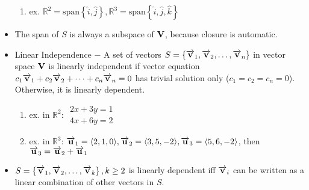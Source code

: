 \documentclass[12pt]{article}
\begin{document}
\begin{itemize}
    \begin{enumerate}

      \item ex. $\mathbb{R}^2=\text{span}\left\{ \hat{i},\hat{j} \right\}, \mathbb{R}^3=\text{span}\left\{ \hat{i},\hat{j},\hat{k} \right\}$

    \end{enumerate}

  \item The span of $S$ is always a subspace of $\bold{V}$, because closure is automatic.

  \item Linear Independence $-$ A set of vectors $S=\left\{ \overrightarrow{\bold{v}}_1,\overrightarrow{\bold{v}}_2,\dots,\overrightarrow{\bold{v}}_n \right\}$ in vector space $\bold{V}$ is linearly independent if vector equation $c_1\overrightarrow{\bold{v}}_1+c_2\overrightarrow{\bold{v}}_2+\dots+c_n\overrightarrow{\bold{v}}_n=0$ has trivial solution only ($c_1=c_2=c_n=0$). Otherwise, it is linearly dependent.

    \begin{enumerate}

      \item ex. in $\mathbb{R}^2$: $\begin{array}{c} 2x+3y=1\\ 4x+6y=2\end{array}$

      \item ex. in $\mathbb{R}^3$: $\overrightarrow{\bold{u}}_1=\langle2,1,0\rangle,\overrightarrow{\bold{u}}_2=\langle 3,5,-2\rangle,\overrightarrow{\bold{u}}_3=\langle 5,6,-2\rangle$, then $\overrightarrow{\bold{u}}_3=\overrightarrow{\bold{u}}_2+\overrightarrow{\bold{u}}_1$

    \end{enumerate}

  \item $S=\left\{ \overrightarrow{\bold{v}}_1,\overrightarrow{\bold{v}}_2,\dots,\overrightarrow{\bold{v}}_k \right\}, k\geq 2$ is linearly dependent iff $\overrightarrow{\bold{v}}_i$ can be written as a linear combination of other vectors in $S$.


\end{itemize}
\end{document}
